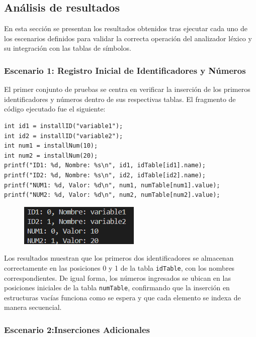 \documentclass{article}
\begin{document}
\subsection{Análisis de resultados}

En esta sección se presentan los resultados obtenidos tras ejecutar cada uno de los escenarios definidos para validar la correcta operación del analizador léxico y su integración con las tablas de símbolos.

\subsubsection{Escenario 1: Registro Inicial de Identificadores y Números}

El primer conjunto de pruebas se centra en verificar la inserción de los primeros identificadores y números dentro de sus respectivas tablas. El fragmento de código ejecutado fue el siguiente:

\begin{verbatim}
int id1 = installID("variable1");
int id2 = installID("variable2");
int num1 = installNum(10);
int num2 = installNum(20);
printf("ID1: %d, Nombre: %s\n", id1, idTable[id1].name);
printf("ID2: %d, Nombre: %s\n", id2, idTable[id2].name);
printf("NUM1: %d, Valor: %d\n", num1, numTable[num1].value);
printf("NUM2: %d, Valor: %d\n", num2, numTable[num2].value);
\end{verbatim}

\begin{figure}[H]
    \centering
    \includegraphics[width=0.5\linewidth]{image.png}
\end{figure}

Los resultados muestran que los primeros dos identificadores se almacenan correctamente en las posiciones 0 y 1 de la tabla \texttt{idTable}, con los nombres correspondientes. De igual forma, los números ingresados se ubican en las posiciones iniciales de la tabla \texttt{numTable}, confirmando que la inserción en estructuras vacías funciona como se espera y que cada elemento se indexa de manera secuencial.

\subsubsection{Escenario 2:Inserciones Adicionales }
\end{document}
